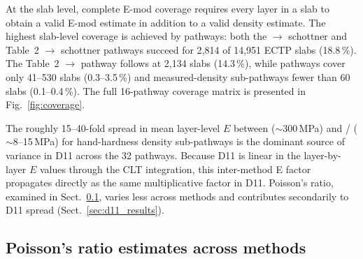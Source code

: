 \documentclass[hess, manuscript]{copernicus}
\begin{document}

At the slab level, complete E-mod coverage requires every layer in a slab to obtain a valid E-mod estimate in addition to a valid density estimate. The highest slab-level coverage is achieved by \citeauthor{schottner2026} pathways: both the \citeauthor{geldsetzer2009} $\to$ schottner and \citeauthor{kimjamieson2009} Table~2 $\to$ schottner pathways succeed for 2{,}814 of 14{,}951 ECTP slabs (18.8\,\%). The \citeauthor{kimjamieson2009} Table~2 $\to$ \citeauthor{wautier2015} pathway follows at 2{,}134 slabs (14.3\,\%), while \citeauthor{kochle2014} pathways cover only 41--530 slabs (0.3--3.5\,\%) and measured-density sub-pathways fewer than 60 slabs (0.1--0.4\,\%). The full 16-pathway coverage matrix is presented in Fig.~\ref{fig:coverage}.


The roughly 15--40-fold spread in mean layer-level $E$ between \citeauthor{wautier2015} ($\sim$300\,\si{MPa}) and \citeauthor{bergfeld2023}/\citeauthor{schottner2026} ($\sim$8--15\,\si{MPa}) for hand-hardness density sub-pathways is the dominant source of variance in D11 across the 32 pathways. Because D11 is linear in the layer-by-layer $E$ values through the CLT integration, this inter-method E factor propagates directly as the same multiplicative factor in D11. Poisson's ratio, examined in Sect.~\ref{sec:nu_results}, varies less across methods and contributes secondarily to D11 spread (Sect.~\ref{sec:d11_results}).


\FloatBarrier

\subsection{Poisson's ratio estimates across methods}
\label{sec:nu_results}

\end{document}
